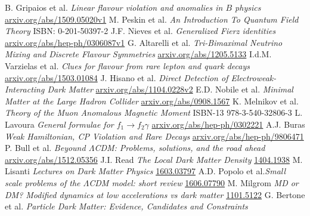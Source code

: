 \documentclass[11pt,a4paper,twoside]{article}
\numberwithin{equation}{section}
\begin{document}
\begin{thebibliography}{xxx}
 B. Gripaios et al. \textit{Linear flavour violation and anomalies in $B$ physics} \href{http://arxiv.org/abs/1509.05020v1}{arxiv.org/abs/1509.05020v1}
 M. Peskin et al. \textit{An Introduction To Quantum Field Theory} ISBN: 0-201-50397-2
 J.F. Nieves et al. \textit{Generalized Fierz identities} \href{http://arxiv.org/abs/hep-ph/0306087v1}{arxiv.org/abs/hep-ph/0306087v1}
 G. Altarelli et al. \textit{Tri-Bimaximal Neutrino Mixing and Discrete Flavour Symmetries} \href{https://arxiv.org/abs/1205.5133}{arxiv.org/abs/1205.5133}
 I.d.M. Varzielas et al. \textit{Clues for flavour from rare lepton and quark decays} \href{https://arxiv.org/abs/1503.01084}{arxiv.org/abs/1503.01084}
 J. Hisano et al. \textit{Direct Detection of Electroweak-Interacting Dark Matter} \href{https://arxiv.org/abs/1104.0228v2}{arxiv.org/abs/1104.0228v2}
 E.D. Nobile et al. \textit{Minimal Matter at the Large Hadron Collider} \href{http://arxiv.org/abs/0908.1567}{arxiv.org/abs/0908.1567}
 K. Melnikov et al. \textit{Theory of the Muon Anomalous Magnetic Moment} ISBN-13 978-3-540-32806-3
 L. Lavoura \textit{General formulae for $f_1\rightarrow f_2 \gamma$} \href{http://arxiv.org/abs/hep-ph/0302221}{arxiv.org/abs/hep-ph/0302221}
 A.J. Buras \textit{Weak Hamiltonian, CP Violation and Rare Decays} \href{http://arxiv.org/abs/hep-ph/9806471}{arxiv.org/abs/hep-ph/9806471}
 P. Bull et al. \textit{Beyound $\Lambda$CDM: Problems, solutions, and the road ahead} \href{http://arxiv.org/abs/1512.05356}{arxiv.org/abs/1512.05356}
 J.I. Read \textit{The Local Dark Matter Density} \href{http://arxiv.org/abs/1404.1938}{1404.1938}
 M. Lisanti \textit{Lectures on Dark Matter Physics} \href{https://arxiv.org/abs/1603.03797}{1603.03797}
 A.D. Popolo et al.\textit{Small scale problems of the $\Lambda$CDM model: short review} \href{https://arxiv.org/abs/1606.07790}{1606.07790}
 M. Milgrom \textit{MD or DM? Modified dynamics at low accelerations vs dark matter} \href{https://arxiv.org/abs/1101.5122}{1101.5122}
 G. Bertone et al. \textit{Particle Dark Matter: Evidence, Candidates and Constraints}
\end{thebibliography}
\end{document}
